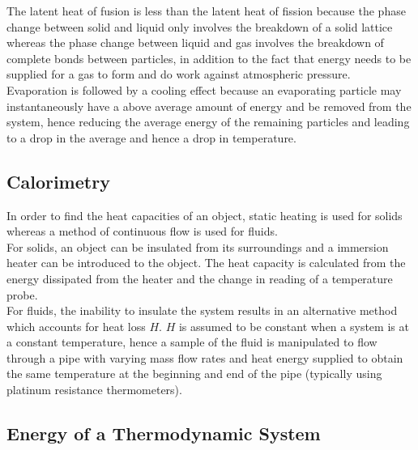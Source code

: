 \documentclass[../main]{subfiles}
\begin{document}
	The latent heat of fusion is less than the latent heat of fission because the phase change between solid and liquid only involves the breakdown of a solid lattice whereas the phase change between liquid and gas involves the breakdown of complete bonds between particles, in addition to the fact that energy needs to be supplied for a gas to form and do work against atmospheric pressure. \\

	Evaporation is followed by a cooling effect because an evaporating particle may instantaneously have a above average amount of energy and be removed from the system, hence reducing the average energy of the remaining particles and leading to a drop in the average and hence a drop in temperature.

	\subsection{Calorimetry}

	In order to find the heat capacities of an object, static heating is used for solids whereas a method of continuous flow is used for fluids. \\

	For solids, an object can be insulated from its surroundings and a immersion heater can be introduced to the object. The heat capacity is calculated from the energy dissipated from the heater and the change in reading of a temperature probe. \\

	For fluids, the inability to insulate the system results in an alternative method which accounts for heat loss \(H\). \(H\) is assumed to be constant when a system is at a constant temperature, hence a sample of the fluid is manipulated to flow through a pipe with varying mass flow rates and heat energy supplied to obtain the same temperature at the beginning and end of the pipe (typically using platinum resistance thermometers). \\


	\subsection{Energy of a Thermodynamic System}
\end{document}
